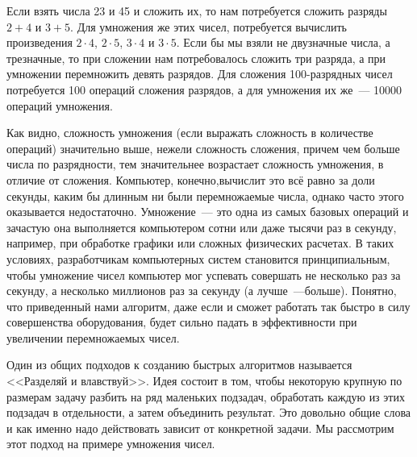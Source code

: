 Если взять числа 23 и 45 и сложить их, то нам потребуется сложить разряды $2+4$ и $3+5$. Для умножения же этих чисел, потребуется вычислить произведения $2\cdot 4$, $2\cdot 5$, $3\cdot 4$ и $3\cdot 5$. Если бы мы взяли не двузначные числа, а трезначные, то при сложении нам потребовалось сложить три разряда, а при умножении перемножить девять разрядов. Для сложения 100-разрядных чисел потребуется 100 операций сложения разрядов, а для умножения их же~--- 10000 операций умножения.

Как видно, сложность умножения (если выражать сложность в количестве операций)  значительно выше, нежели сложность сложения, причем чем больше числа по разрядности, тем значительнее возрастает сложность умножения, в отличие от сложения. Компьютер, конечно,вычислит это всё равно за доли секунды, каким бы длинным ни были перемножаемые числа, однако часто этого оказывается недостаточно. Умножение~--- это одна из самых базовых операций и зачастую она выполняется компьютером сотни или даже тысячи раз в секунду, например, при обработке графики или сложных физических расчетах. В таких условиях, разработчикам компьютерных систем становится принципиальным, чтобы умножение чисел компьютер мог успевать совершать не несколько раз за секунду, а несколько миллионов раз за секунду (а лучше~---больше). Понятно, что приведенный нами алгоритм, даже если и сможет работать так быстро в силу совершенства оборудования, будет сильно падать в эффективности при увеличении перемножаемых чисел.

Один из общих подходов к созданию быстрых алгоритмов называется <<Разделяй и влавствуй>>. Идея состоит в том, чтобы некоторую крупную по размерам задачу разбить на ряд маленьких подзадач, обработать каждую из этих подзадач в отдельности, а затем объединить результат. Это довольно общие слова и как именно надо действовать зависит от конкретной задачи. Мы рассмотрим этот подход на примере умножения чисел.


